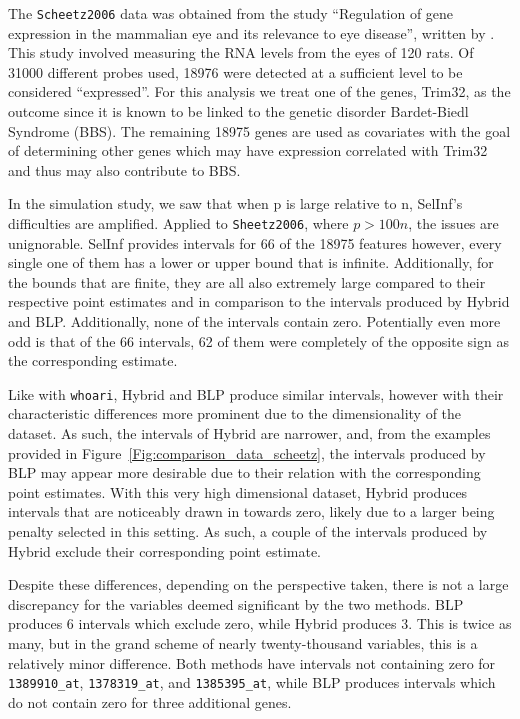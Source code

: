 The \texttt{Scheetz2006} data was obtained from the study ``Regulation of gene expression in the mammalian eye and its relevance to eye disease'', written by \cite{Scheetz2006}. This study involved measuring the RNA levels from the eyes of 120 rats. Of 31000 different probes used, 18976 were detected at a sufficient level to be considered ``expressed''. For this analysis we treat one of the genes, Trim32, as the outcome since it is known to be linked to the genetic disorder Bardet-Biedl Syndrome (BBS). The remaining 18975 genes are used as covariates with the goal of determining other genes which may have expression correlated with Trim32 and thus may also contribute to BBS. 

In the simulation study, we saw that when p is large relative to n, SelInf's difficulties are amplified. Applied to \texttt{Sheetz2006}, where $p > 100n$, the issues are unignorable. SelInf provides intervals for 66 of the 18975 features however, every single one of them has a lower or upper bound that is infinite. Additionally, for the bounds that are finite, they are all also extremely large compared to their respective point estimates and in comparison to the intervals produced by Hybrid and BLP. Additionally, none of the intervals contain zero. Potentially even more odd is that of the 66 intervals, 62 of them were completely of the opposite sign as the corresponding estimate. 

Like with \texttt{whoari}, Hybrid and BLP produce similar intervals, however with their characteristic differences more prominent due to the dimensionality of the dataset. As such, the intervals of Hybrid are narrower, and, from the examples provided in Figure~\ref{Fig:comparison_data_scheetz}, the intervals produced by BLP may appear more desirable due to their relation with the corresponding point estimates. With this very high dimensional dataset, Hybrid produces intervals that are noticeably drawn in towards zero, likely due to a larger being penalty selected in this setting. As such, a couple of the intervals produced by Hybrid exclude their corresponding point estimate. 

Despite these differences, depending on the perspective taken, there is not a large discrepancy for the variables deemed significant by the two methods. BLP produces 6 intervals which exclude zero, while Hybrid produces 3. This is twice as many, but in the grand scheme of nearly twenty-thousand variables, this is a relatively minor difference. Both methods have intervals not containing zero for \texttt{1389910\_at}, \texttt{1378319\_at}, and \texttt{1385395\_at}, while BLP produces intervals which do not contain zero for three additional genes.

